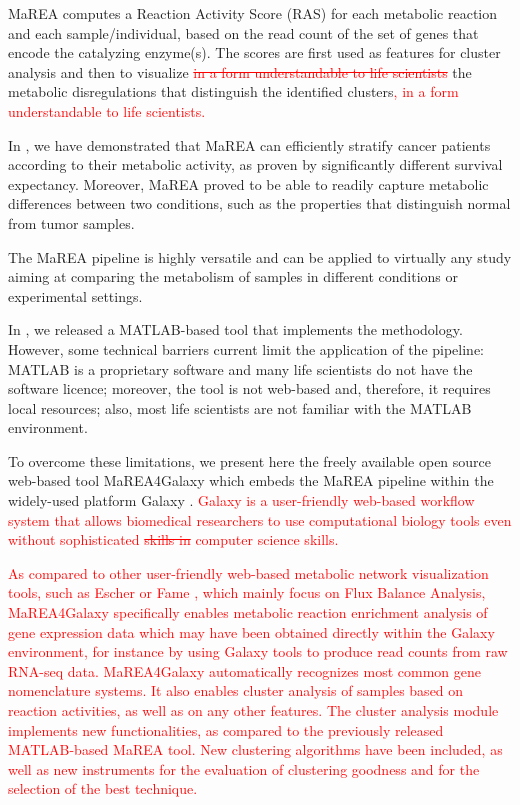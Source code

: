 \documentclass[preprint,12pt,authoryear]{elsarticle}
\newcommand{\red}{\textcolor{red}}
\newcommand{\mareagalaxy}{\textsf{MaREA4Galaxy}}
\newcommand{\mareaTool}{\textsf{MaREA}}
\begin{document}
\mareaTool{} computes a Reaction Activity Score (RAS) for each
metabolic reaction and each sample/individual, based on the read count
of the set of genes that encode the catalyzing enzyme(s).
%
The scores are first used as features for cluster analysis and then to
visualize \red{\sout{in a form understandable to life scientists}} the
metabolic disregulations that distinguish the identified
clusters\red{, in a form understandable to life scientists.}

In \citep{marea}, we have demonstrated that \mareaTool{} can
efficiently stratify cancer patients according to their metabolic
activity, as proven by significantly different survival expectancy.
%
Moreover, \mareaTool{} proved to be able to readily capture
metabolic differences between two conditions, such as the properties
that distinguish normal from tumor samples. %

The \mareaTool{} pipeline is highly versatile and can be applied to
virtually any study aiming at comparing the metabolism of samples in
different conditions or experimental settings.

In \citep{marea}, we released a MATLAB-based tool that implements the
methodology. However, some technical barriers current limit the
application of the pipeline: MATLAB is a proprietary software and many
life scientists do not have the software licence; moreover, the tool
is not web-based and, therefore, it requires local resources; also,
most life scientists are not familiar with the MATLAB environment.

To overcome these limitations, we present here the freely available
open source web-based tool \mareagalaxy{} which embeds the
\mareaTool{} pipeline within the widely-used platform Galaxy
\citep{galaxy}.
%
\textcolor{red}{Galaxy is a user-friendly web-based workflow system
  that allows biomedical researchers to use computational biology
  tools even without sophisticated \sout{skills in} computer science skills.}

\red{As compared to other user-friendly web-based metabolic network
  visualization tools, such as Escher \citep{king2015escher} or Fame
  \citep{boele2012fame}, which mainly focus on Flux Balance Analysis,
  \mareagalaxy{} specifically enables metabolic reaction enrichment
  analysis of gene expression data which may have been obtained
  directly within the Galaxy environment, for instance by using Galaxy
  tools to produce read counts from raw RNA-seq data. \mareagalaxy{}
  automatically recognizes most common gene nomenclature systems.
  It also enables cluster analysis of samples based on reaction
  activities, as well as on any other features. The cluster analysis
  module implements new functionalities, as compared to the previously
  released MATLAB-based \mareaTool{} tool. New clustering algorithms
  have been included, as well as new instruments for the evaluation of
  clustering goodness and for the selection of the best technique.}
\end{document}
